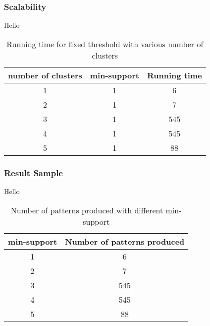 \documentclass[11pt]{article}
\begin{document}
\subsubsection{Scalability}

Hello

\begin{table}
    \centering
    \begin{tabular}{||c c c||}
        \hline
        number of clusters & min-support & Running time \\
        \hline\hline
        1 & 1 & 6 \\
        2 & 1 & 7 \\
        3 & 1 & 545 \\
        4 & 1 & 545 \\
        5 & 1 & 88 \\
        \hline
    \end{tabular}
    \caption{Running time for fixed threshold with various number of clusters}
    \label{table:3}
\end{table}

\subsubsection{Result Sample}

Hello


\begin{table}
    \centering
    \begin{tabular}{||c c||}
        \hline
        min-support & Number of patterns produced \\
        \hline\hline
        1 & 6 \\
        2 & 7 \\
        3 & 545 \\
        4 & 545 \\
        5 & 88 \\ [1ex]
        \hline
    \end{tabular}
    \caption{Number of patterns produced with different min-support}
    \label{table:4}
\end{table}
\end{document}
